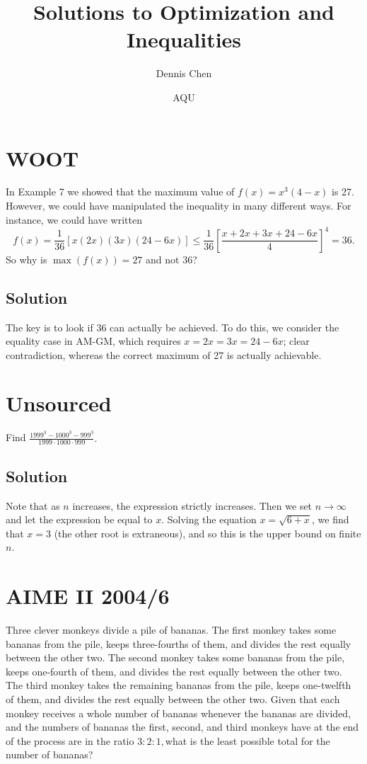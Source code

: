 \documentclass{article}
\title{Solutions to Optimization and Inequalities}
\author{Dennis Chen}
\date{AQU}
\begin{document}
\maketitle

\toc

\pagebreak\section{WOOT}

In Example 7 we showed that the maximum value of $f(x)=x^3(4-x)$ is 27. However, we could have manipulated the inequality in many different ways. For instance, we could have written \[f(x)=\frac 1{36}[x(2x)(3x)(24-6x)]\le\frac1{36}\left[\frac{x+2x+3x+24-6x}4\right]^4=36.\] So why is $\max(f(x))=27$ and not 36?

\subsection{Solution}

The key is to look if 36 can actually be achieved. To do this, we consider the equality case in AM-GM, which requires $x=2x=3x=24-6x$; clear contradiction, whereas the correct maximum of 27 is actually achievable.

\pagebreak\section{Unsourced}

Find $\frac{1999^3-1000^3-999^3}{1999\cdot 1000\cdot 999}.$

\subsection{Solution}

Note that as $n$ increases, the expression strictly increases. Then we set $n\to\infty$ and let the expression be equal to $x$. Solving the equation $x=\sqrt{6+x}$, we find that $x=3$ (the other root is extraneous), and so this is the upper bound on finite $n$.

\pagebreak\section{AIME II 2004/6}
Three clever monkeys divide a pile of bananas. The first monkey takes some bananas from the pile, keeps three-fourths of them, and divides the rest equally between the other two. The second monkey takes some bananas from the pile, keeps one-fourth of them, and divides the rest equally between the other two. The third monkey takes the remaining bananas from the pile, keeps one-twelfth of them, and divides the rest equally between the other two. Given that each monkey receives a whole number of bananas whenever the bananas are divided, and the numbers of bananas the first, second, and third monkeys have at the end of the process are in the ratio $3: 2: 1,$what is the least possible total for the number of bananas?
\end{document}
